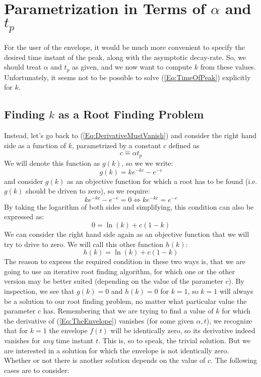 \section{Parametrization in Terms of $\alpha$ and $t_p$}
For the user of the envelope, it would be much more convenient to specify the desired time instant of the peak, along with the asymptotic decay-rate. So, we should treat $\alpha$ and $t_p$ as given, and we now want to compute $k$ from these values. Unfortunately, it seems not to be possible to solve (\ref{Eq:TimeOfPeak}) explicitly for $k$. 

\subsection{Finding $k$ as a Root Finding Problem}
Instead, let's go back to (\ref{Eq:DerivativeMustVanish}) and consider the right hand side as a function of $k$, parametrized by a constant $c$ defined as 
\begin{equation}
 \boxed
 {
  c \hat{=} \alpha t_p
 }
\end{equation}
We will denote this function as $g(k)$, so we we write:
\begin{equation}
 \boxed
 {
  g(k) = k e^{-k c} - e^{-c}
 }
\end{equation}
and consider $g(k)$ as an objective function for which a root has to be found (i.e. $g(k)$ should be driven to zero), so we require:
\begin{equation}
  k e^{-k c} - e^{-c} = 0 \Leftrightarrow k e^{-k c} = e^{-c}
\end{equation}
By taking the logarithm of both sides and simplifying, this condition can also be expressed as:
\begin{equation}
  0 = \ln(k) + c(1-k)
\end{equation}
We can consider the right hand side again as an objective function that we will try to drive to zero. We will call this other function $h(k)$:
\begin{equation}
 \boxed
 {
  h(k) = \ln(k) + c(1-k)
 }
\end{equation}
The reason to express the required condition in these two ways is, that we are going to use an iterative root finding algorithm, for which one or the other version may be better suited (depending on the value of the parameter $c$). By inspection, we see that $g(k) = 0$ and $h(k) = 0$ for $k = 1$, so $k = 1$ will always be a solution to our root finding problem, no matter what particular value the parameter $c$ has. Remembering that we are trying to find a value of $k$ for which the derivative of (\ref{Eq:TheEnvelope}) vanishes (for some given $\alpha, t$), we recognize that for $k=1$ the envelope $f(t)$ will be identically zero, so its derivative indeed vanishes for \emph{any} time instant $t$. This is, so to speak, the trivial solution. But we are interested in a solution for which the envelope is not identically zero. Whether or not there is another solution depends on the value of $c$. The following cases are to consider:
